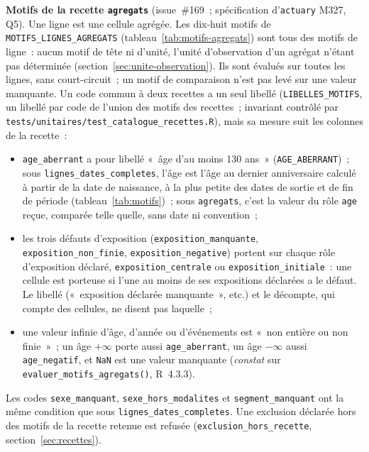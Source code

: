 \documentclass[a4paper,11pt]{article}
\newcommand{\code}[1]{\texttt{\small #1}}
\begin{document}
\medskip
{\sloppy{}\noindent
\textbf{Motifs de la recette \code{agregats}} (issue~\#169~; spécification
d'\code{actuary} M327, Q5). Une ligne est une cellule agrégée. Les dix-huit
motifs de \code{MOTIFS\_LIGNES\_AGREGATS} (tableau~\ref{tab:motifs-agregats})
sont tous des motifs de ligne~: aucun motif de tête ni d'unité, l'unité
d'observation d'un agrégat n'étant pas déterminée
(section~\ref{sec:unite-observation}). Ils sont évalués sur toutes les
lignes, sans court-circuit~; un motif de comparaison n'est pas levé sur une
valeur manquante. Un code commun à deux recettes a un seul libellé
(\code{LIBELLES\_MOTIFS}, un libellé par code de l'union des motifs des
recettes~; invariant contrôlé par
\code{tests/unitaires/test\_catalogue\_recettes.R}), mais sa mesure suit les
colonnes de la recette~:
\begin{itemize}[leftmargin=*, itemsep=2pt]
  \item \code{age\_aberrant} a pour libellé «~âge d'au moins 130 ans~»
    (\code{AGE\_ABERRANT})~; sous \code{lignes\_dates\_completes}, l'âge est
    l'âge au dernier anniversaire calculé à partir de la date de naissance, à
    la plus petite des dates de sortie et de fin de période
    (tableau~\ref{tab:motifs})~; sous \code{agregats}, c'est la valeur du
    rôle \code{age} reçue, comparée telle quelle, sans date ni convention~;
  \item les trois défauts d'exposition (\code{exposition\_manquante},
    \code{exposition\_non\_finie}, \code{exposition\_negative}) portent sur
    chaque rôle d'exposition déclaré, \code{exposition\_centrale} ou
    \code{exposition\_initiale}~: une cellule est porteuse si l'une au moins
    de ses expositions déclarées a le défaut. Le libellé («~exposition
    déclarée manquante~», etc.) et le décompte, qui compte des cellules, ne
    disent pas laquelle~;
  \item une valeur infinie d'âge, d'année ou d'événements est «~non entière
    ou non finie~»~; un âge $+\infty$ porte aussi \code{age\_aberrant}, un âge
    $-\infty$ aussi \code{age\_negatif}, et \code{NaN} est une valeur
    manquante (\emph{constat} sur \code{evaluer\_motifs\_agregats()},
    R~4.3.3).
\end{itemize}
Les codes \code{sexe\_manquant}, \code{sexe\_hors\_modalites} et
\code{segment\_manquant} ont la même condition que sous
\code{lignes\_dates\_completes}. Une exclusion déclarée hors des motifs de
la recette retenue est refusée (\code{exclusion\_hors\_recette},
section~\ref{sec:recettes}).\par}
\end{document}
